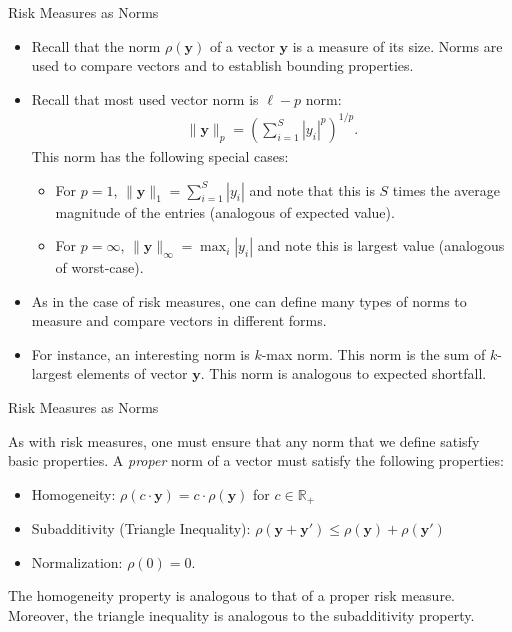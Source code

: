 \documentclass[9pt]{beamer}
\begin{document}
%
\begin{frame}{Risk Measures as Norms}

\begin{itemize}
\setlength{\itemsep}{10pt}
\item Recall that the norm $\rho(\mathbf{y})$ of a vector $\mathbf{y}$ is a measure of its size. Norms are used to compare vectors and to establish bounding properties.   

\item Recall that most used vector norm is $\ell-p$ norm:
\begin{align*}
\|\mathbf{y}\|_p=\left(\sum_{i=1}^S|y_i|^p\right)^{1/p}.
\end{align*}
This norm has the following special cases:
\begin{itemize}
\setlength{\itemsep}{10pt}
\item For $p=1$, $\|\mathbf{y}\|_1=\sum_{i=1}^S|y_i|$ and note that this is $S$ times the average magnitude of the entries (analogous of expected value). 
\item For $p=\infty$, $\|\mathbf{y}\|_\infty=\max_{i} |y_i|$ and note this is largest value (analogous of worst-case). 
\end{itemize}
\item As in the case of risk measures, one can define many types of norms to measure and compare vectors in different forms. 

\item For instance, an interesting norm is $k$-max norm. This norm is the sum of $k$-largest elements of vector $\mathbf{y}$. This norm is analogous to expected shortfall.   
\end{itemize}

\end{frame}


%
\begin{frame}{Risk Measures as Norms}

As with risk measures, one must ensure that any norm that we define satisfy basic properties.  A {\em proper} norm of a vector must satisfy the following properties:

\begin{itemize}
\setlength{\itemsep}{10pt}
\item Homogeneity: $\rho(c\cdot \mathbf{y})=c\cdot \rho(\mathbf{y})$ for $c\in \mathbb{R}_+$
\item Subadditivity (Triangle Inequality): $\rho(\mathbf{y}+\mathbf{y}')\leq \rho(\mathbf{y})+\rho(\mathbf{y}')$
\item Normalization: $\rho(0)=0$.
\end{itemize}
The homogeneity property is analogous to that of a proper risk measure. Moreover, the triangle inequality is analogous to the  subadditivity property. 

\end{frame}
\end{document}
